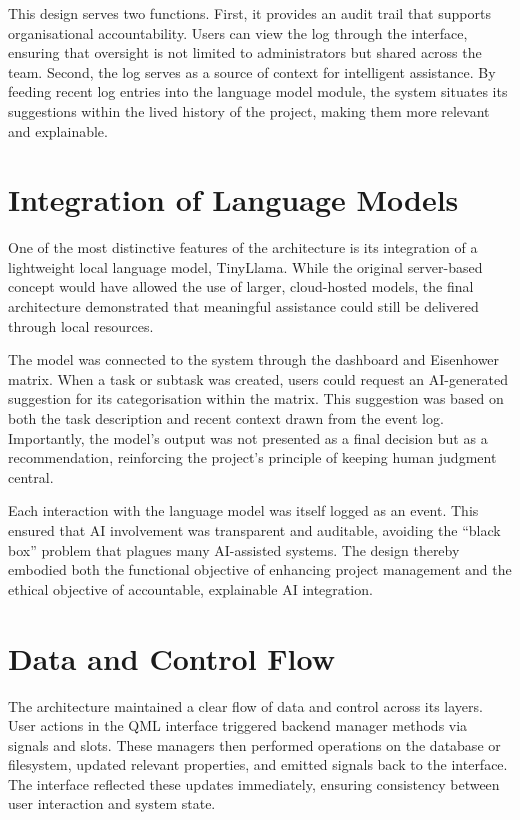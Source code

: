 \documentclass{report}
\begin{document}
This design serves two functions. First, it provides an audit trail that supports organisational accountability. Users can view the log through the interface, ensuring that oversight is not limited to administrators but shared across the team. Second, the log serves as a source of context for intelligent assistance. By feeding recent log entries into the language model module, the system situates its suggestions within the lived history of the project, making them more relevant and explainable.

\section{Integration of Language Models}

One of the most distinctive features of the architecture is its integration of a lightweight local language model, TinyLlama. While the original server-based concept would have allowed the use of larger, cloud-hosted models, the final architecture demonstrated that meaningful assistance could still be delivered through local resources.

The model was connected to the system through the dashboard and Eisenhower matrix. When a task or subtask was created, users could request an AI-generated suggestion for its categorisation within the matrix. This suggestion was based on both the task description and recent context drawn from the event log. Importantly, the model's output was not presented as a final decision but as a recommendation, reinforcing the project's principle of keeping human judgment central.

Each interaction with the language model was itself logged as an event. This ensured that AI involvement was transparent and auditable, avoiding the “black box” problem that plagues many AI-assisted systems. The design thereby embodied both the functional objective of enhancing project management and the ethical objective of accountable, explainable AI integration.

\section{Data and Control Flow}

The architecture maintained a clear flow of data and control across its layers. User actions in the QML interface triggered backend manager methods via signals and slots. These managers then performed operations on the database or filesystem, updated relevant properties, and emitted signals back to the interface. The interface reflected these updates immediately, ensuring consistency between user interaction and system state.
\end{document}
